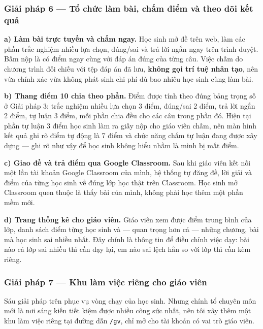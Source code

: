\subsubsection{Giải pháp 6 --- Tổ chức làm bài, chấm điểm và theo dõi kết quả}

\textbf{a) Làm bài trực tuyến và chấm ngay.} Học sinh mở đề trên web, làm các
phần trắc nghiệm nhiều lựa chọn, đúng/sai và trả lời ngắn ngay trên trình
duyệt. Bấm nộp là có điểm ngay cùng với đáp án đúng của từng câu. Việc chấm do
chương trình đối chiếu với tệp đáp án đã lưu, \textbf{không gọi trí tuệ nhân
tạo}, nên vừa chính xác vừa không phát sinh chi phí dù bao nhiêu học sinh cùng
làm bài.

\textbf{b) Thang điểm 10 chia theo phần.} Điểm được tính theo đúng bảng trọng
số ở Giải pháp 3: trắc nghiệm nhiều lựa chọn 3 điểm, đúng/sai 2 điểm, trả lời
ngắn 2 điểm, tự luận 3 điểm, mỗi phần chia đều cho các câu trong phần đó. Hiện
tại phần tự luận 3 điểm học sinh làm ra giấy nộp cho giáo viên chấm, nên màn
hình kết quả ghi rõ điểm tự động là 7 điểm và chức năng chấm tự luận đang được
xây dựng --- ghi rõ như vậy để học sinh không hiểu nhầm là mình bị mất điểm.

\textbf{c) Giao đề và trả điểm qua Google Classroom.} Sau khi giáo viên kết
nối một lần tài khoản Google Classroom của mình, hệ thống tự đăng đề, lời giải
và điểm của từng học sinh về đúng lớp học thật trên Classroom. Học sinh mở
Classroom quen thuộc là thấy bài của mình, không phải học thêm một phần mềm
mới.

\textbf{d) Trang thống kê cho giáo viên.} Giáo viên xem được điểm trung bình
của lớp, danh sách điểm từng học sinh và --- quan trọng hơn cả --- những
chương, bài mà học sinh sai nhiều nhất. Đây chính là thông tin để điều chỉnh
việc dạy: bài nào cả lớp sai nhiều thì cần dạy lại, em nào sai lệch hẳn so với
lớp thì cần kèm riêng.


\subsubsection{Giải pháp 7 --- Khu làm việc riêng cho giáo viên}

Sáu giải pháp trên phục vụ vòng chạy của học sinh. Nhưng chính tổ chuyên môn
mới là nơi sáng kiến tiết kiệm được nhiều công sức nhất, nên tôi xây thêm một
khu làm việc riêng tại đường dẫn \texttt{/gv}, chỉ mở cho tài khoản có vai trò
giáo viên.

